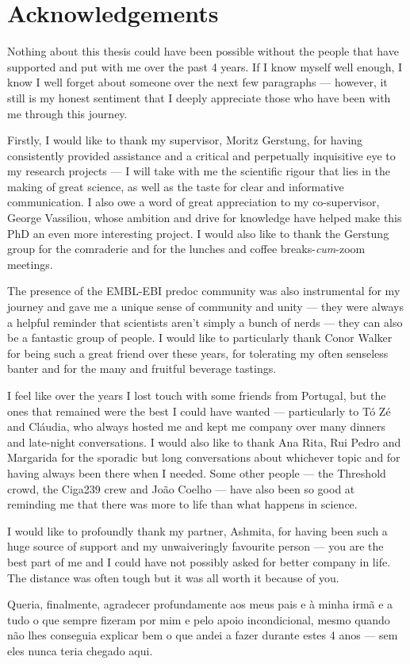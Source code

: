 \chapter{Acknowledgements}

Nothing about this thesis could have been possible without the people that have supported and put with me over the past 4 years. If I know myself well enough, I know I well forget about someone over the next few paragraphs --- however, it still is my honest sentiment that I deeply appreciate those who have been with me through this journey.

Firstly, I would like to thank my supervisor, Moritz Gerstung, for having consistently provided assistance and a critical and perpetually inquisitive eye to my research projects --- I will take with me the scientific rigour that lies in the making of great science, as well as the taste for clear and informative communication. I also owe a word of great appreciation to my co-supervisor, George Vassiliou, whose ambition and drive for knowledge have helped make this PhD an even more interesting project. I would also like to thank the Gerstung group for the comraderie and for the lunches and coffee breaks-\textit{cum}-zoom meetings.

The presence of the EMBL-EBI predoc community was also instrumental for my journey and gave me a unique sense of community and unity --- they were always a helpful reminder that scientists aren't simply a bunch of nerds --- they can also be a fantastic group of people. I would like to particularly thank Conor Walker for being such a great friend over these years, for tolerating my often senseless banter and for the many and fruitful beverage tastings. 

I feel like over the years I lost touch with some friends from Portugal, but the ones that remained were the best I could have wanted --- particularly to Tó Zé and Cláudia, who always hosted me and kept me company over many dinners and late-night conversations. I would also like to thank Ana Rita, Rui Pedro and Margarida for the sporadic but long conversations about whichever topic and for having always been there when I needed. Some other people --- the Threshold crowd, the Ciga239 crew and João Coelho --- have also been so good at reminding me that there was more to life than what happens in science. 

I would like to profoundly thank my partner, Ashmita, for having been such a huge source of support and my unwaiveringly favourite person --- you are the best part of me and I could have not possibly asked for better company in life. The distance was often tough but it was all worth it because of you.

Queria, finalmente, agradecer profundamente aos meus pais e à minha irmã e a tudo o que sempre fizeram por mim e pelo apoio incondicional, mesmo quando não lhes conseguia explicar bem o que andei a fazer durante estes 4 anos --- sem eles nunca teria chegado aqui.